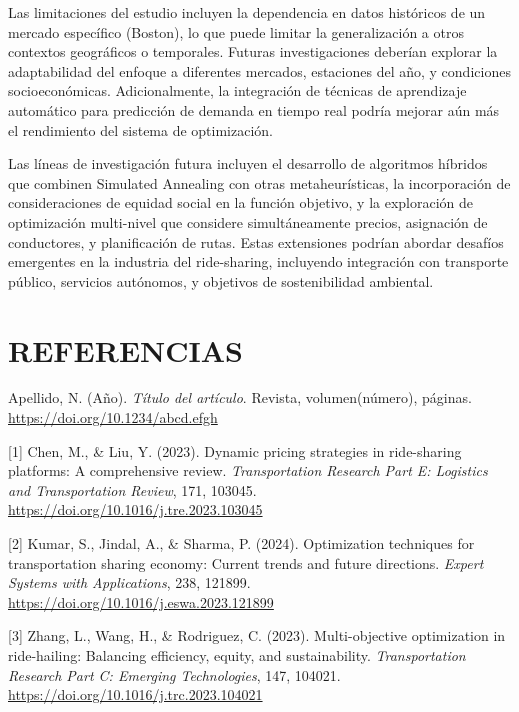 \documentclass[12pt,a4paper,twocolumn]{article}
\begin{document}
Las limitaciones del estudio incluyen la dependencia en datos históricos de un mercado específico (Boston), lo que puede limitar la generalización a otros contextos geográficos o temporales. Futuras investigaciones deberían explorar la adaptabilidad del enfoque a diferentes mercados, estaciones del año, y condiciones socioeconómicas. Adicionalmente, la integración de técnicas de aprendizaje automático para predicción de demanda en tiempo real podría mejorar aún más el rendimiento del sistema de optimización.

Las líneas de investigación futura incluyen el desarrollo de algoritmos híbridos que combinen Simulated Annealing con otras metaheurísticas, la incorporación de consideraciones de equidad social en la función objetivo, y la exploración de optimización multi-nivel que considere simultáneamente precios, asignación de conductores, y planificación de rutas. Estas extensiones podrían abordar desafíos emergentes en la industria del ride-sharing, incluyendo integración con transporte público, servicios autónomos, y objetivos de sostenibilidad ambiental.

\section{REFERENCIAS}
\begin{thebibliography}{9}

Apellido, N. (Año). \textit{Título del artículo}. Revista, volumen(número), páginas.
\href{https://doi.org/10.1234/abcd.efgh}{https://doi.org/10.1234/abcd.efgh}

\end{thebibliography}


[1] Chen, M., \& Liu, Y. (2023). Dynamic pricing strategies in ride-sharing platforms: A comprehensive review. \textit{Transportation Research Part E: Logistics and Transportation Review}, 171, 103045. \url{https://doi.org/10.1016/j.tre.2023.103045}

[2] Kumar, S., Jindal, A., \& Sharma, P. (2024). Optimization techniques for transportation sharing economy: Current trends and future directions. \textit{Expert Systems with Applications}, 238, 121899. \url{https://doi.org/10.1016/j.eswa.2023.121899}

[3] Zhang, L., Wang, H., \& Rodriguez, C. (2023). Multi-objective optimization in ride-hailing: Balancing efficiency, equity, and sustainability. \textit{Transportation Research Part C: Emerging Technologies}, 147, 104021. \url{https://doi.org/10.1016/j.trc.2023.104021}
\end{document}
